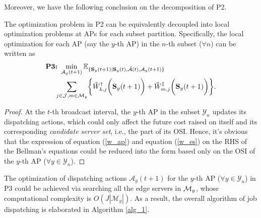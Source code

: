 Moreover, we have the following conclusion on the decomposition of P2.
\begin{lemma}[]
    The optimization problem in P2 can be equivalently decoupled into local optimization problems at APs {for each subset partition}.
    Specifically, {the local optimization for each AP (say the $y$-th AP) in the $n$-th subset ($\forall n$) can be written as}
    \small{\begin{align}
        &\textbf{P3:}~
        \min_{ {\mathcal{A}}_{y}(t+1) }
        \mathbb{E}_{\set{ \Stat_{y}(t+1)|\Stat_{y}(t), \hat{\mathcal{A}}(t), {\mathcal{A}}_{y}(t+1) }}
        \nonumber\\
        &~~~~\sum_{ j\in\jSpace,m\in\esSet_{y} } \Brace{
            \tilde{W}^{\AP}_{k,j}\Paren{\Stat_{y}(t+1)}
            +\tilde{W}^{\ES}_{m,j}\Paren{\Stat_{y}(t+1)}
        }.
        \label{eqn:partial}
    \end{align} }
    \label{lemma:w_partial}
\end{lemma}
\begin{proof}
    At the $t$-th broadcast interval, the $y$-th AP in the subset $\mathcal{Y}_{n}$ updates its dispatching actions, which could only affect the future cost raised on itself and its corresponding \emph{candidate server set}, i.e., the part of its OSI.
    Hence, it's obvious that the expression of equation (\ref{w_ap}) and equation (\ref{w_es}) on the RHS of the Bellman's equations could be reduced into the form based only on the OSI of the $y$-th AP ($\forall y\in\mathcal{Y}_{n}$).
\end{proof}
The optimization of dispatching actions $\mathcal{A}_{y}(t+1)$ for the $y$-th AP ($\forall y\in\mathcal{Y}_{n}$) in P3 could be achieved via searching all the edge servers in $\mathcal{M}_{y}$, whose computational complexity is $O(J|\mathcal{M}_{y}|)$.
As a result, the overall algorithm of job dispatching is elaborated in Algorithm \ref{alg_1}.

